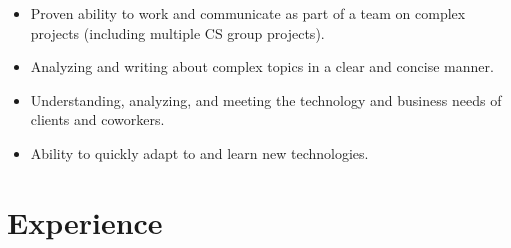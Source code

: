 \documentclass[10pt]{article}
\begin{document}
\begin{itemize}

    \item Proven ability to work and communicate as part of a team on complex projects (including multiple CS group projects).

    \item Analyzing and writing about complex topics in a clear and concise manner.

    \item Understanding, analyzing, and meeting the technology and business needs of clients and coworkers.

    \item Ability to quickly adapt to and learn new technologies.

\end{itemize}



\section{Experience}
\end{document}
